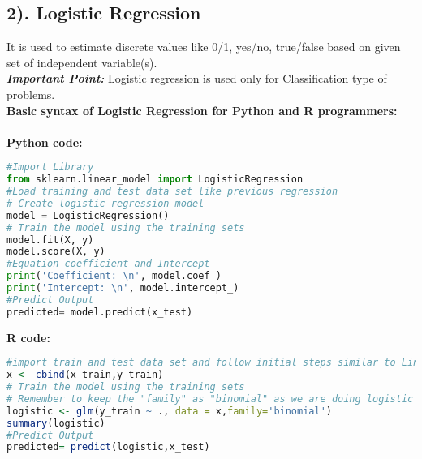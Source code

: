 \documentclass[Proceedings]{ascelike}
\begin{document}
\subsection{2). Logistic Regression}
 It is used to estimate discrete values like 0/1, yes/no, true/false  based on given set of independent variable(s).\\ 
\textbf{\textit{Important Point:}} Logistic regression is used only for Classification type of problems.\\ 

\textbf{Basic syntax of Logistic Regression for Python and R programmers:}\\
\\\textbf{Python code:}
\begin{lstlisting}[language=Python]
#Import Library
from sklearn.linear_model import LogisticRegression
#Load training and test data set like previous regression
# Create logistic regression model
model = LogisticRegression()
# Train the model using the training sets
model.fit(X, y)
model.score(X, y)
#Equation coefficient and Intercept
print('Coefficient: \n', model.coef_)
print('Intercept: \n', model.intercept_)
#Predict Output
predicted= model.predict(x_test)

\end{lstlisting}
\textbf{R code:}
\begin{lstlisting}[language=R]
#import train and test data set and follow initial steps similar to Linear regression.
x <- cbind(x_train,y_train)
# Train the model using the training sets
# Remember to keep the "family" as "binomial" as we are doing logistic regression! 
logistic <- glm(y_train ~ ., data = x,family='binomial')
summary(logistic)
#Predict Output
predicted= predict(logistic,x_test)
\end{lstlisting}
\end{document}
